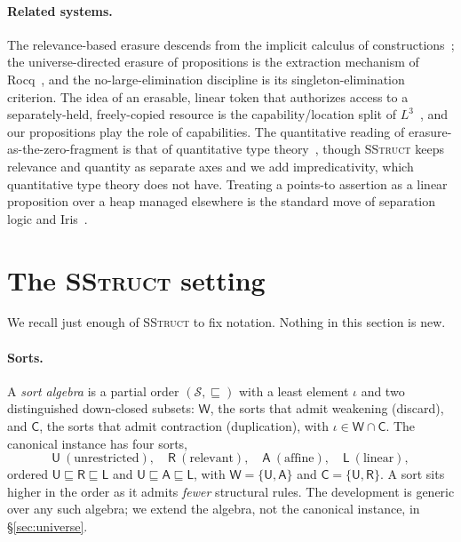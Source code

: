 \documentclass[11pt]{article}
\newcommand{\Srt}{\mathcal{S}}
\newcommand{\Wk}{\mathsf{W}}
\newcommand{\Co}{\mathsf{C}}
\newcommand{\sle}{\sqsubseteq}
\theoremstyle{definition}
\theoremstyle{plain}
\begin{document}
\paragraph{Related systems.}
The relevance-based erasure descends from the implicit calculus of
constructions~\cite{iccstar}; the universe-directed erasure of propositions is the
extraction mechanism of Rocq~\cite{letouzey}, and the no-large-elimination
discipline is its singleton-elimination criterion. The idea of an erasable,
linear token that authorizes access to a separately-held, freely-copied resource
is the capability/location split of $L^3$~\cite{l3}, and our propositions play
the role of capabilities. The quantitative reading of erasure-as-the-zero-fragment
is that of quantitative type theory~\cite{qtt}, though \textsc{SStruct} keeps
relevance and quantity as separate axes and we add impredicativity, which
quantitative type theory does not have. Treating a points-to assertion as a
linear proposition over a heap managed elsewhere is the standard move of
separation logic and Iris~\cite{iris}.

\section{The \textsc{SStruct} setting}\label{sec:setting}

We recall just enough of \textsc{SStruct} to fix notation. Nothing in this
section is new.

\paragraph{Sorts.}
A \emph{sort algebra} is a partial order $(\Srt,\sle)$ with a least element
$\iota$ and two distinguished down-closed subsets: $\Wk$, the sorts that admit
weakening (discard), and $\Co$, the sorts that admit contraction (duplication),
with $\iota\in\Wk\cap\Co$. The canonical instance has four sorts,
\[
  \mathsf{U}\ (\text{unrestricted}),\quad
  \mathsf{R}\ (\text{relevant}),\quad
  \mathsf{A}\ (\text{affine}),\quad
  \mathsf{L}\ (\text{linear}),
\]
ordered $\mathsf{U}\sle\mathsf{R}\sle\mathsf{L}$ and
$\mathsf{U}\sle\mathsf{A}\sle\mathsf{L}$, with
$\Wk=\{\mathsf{U},\mathsf{A}\}$ and $\Co=\{\mathsf{U},\mathsf{R}\}$. A sort sits
higher in the order as it admits \emph{fewer} structural rules. The development
is generic over any such algebra; we extend the algebra, not the canonical
instance, in \S\ref{sec:universe}.
\end{document}
